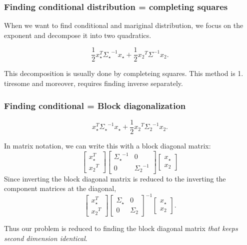 \documentclass{beamer}
\newcommand{\half}{\frac{1}{2}}
\newcommand{\transpose}[1]{{#1}^T}
\newcommand{\inverse}[1]{{#1}^{-1}}
\begin{document}
\begin{frame}
    \frametitle{Finding conditional distribution = completing squares}

    When we want to find conditional and mariginal distribution, we focus on the exponent and decompose it into two quadratics.

    \begin{equation}
        \half \transpose{x}_\star \inverse{\Sigma_\star} x_\star + \half \transpose{x_2}  \inverse{\Sigma} x_2.
    \end{equation}

    This decomposition is usually done by completeing squares.  This method is 1. tiresome and moreover, requires finding inverse separately.



\end{frame}    

\begin{frame}
    \frametitle{Finding conditional = Block diagonalization}

    
    \begin{equation}
        \transpose{x}_\star \inverse{\Sigma_\star} x_\star + \half \transpose{x_2}  \inverse{\Sigma_2} x_2.
    \end{equation}
    
    In matrix notation, we can write this with a block diagonal matrix:
    \begin{equation}
        \begin{bmatrix}
            \transpose{x}_\star \\ \transpose{x_2}    
        \end{bmatrix}
        \begin{bmatrix}
            \inverse{\Sigma_\star} & 0 \\
            0 & \inverse{\Sigma_2}    
        \end{bmatrix}
        \begin{bmatrix}
            x_\star \\ x_2
        \end{bmatrix}
    \end{equation}
    Since inverting the block diagonal matrix is reduced to the inverting the component matrices at the diagonal, 
    \begin{equation}
        \begin{bmatrix}
            \transpose{x}_\star \\ \transpose{x_2}    
        \end{bmatrix}
        \inverse{
        \begin{bmatrix}
            {\Sigma_\star} & 0 \\
            0 & {\Sigma_2}    
        \end{bmatrix}
        }
        \begin{bmatrix}
            x_\star \\ x_2
        \end{bmatrix}.
    \end{equation}

    Thus our problem is reduced to finding the block diagonal matrix \emph{that keeps second dimension identical}.
\end{frame}
\end{document}

